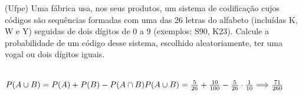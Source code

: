 \begin{ex}
(Ufpe) Uma fábrica usa, nos seus produtos, um sistema de codificação cujos códigos são sequências formadas com uma das 26 letras do alfabeto (incluídas K, W e Y) seguidas de dois dígitos de 0 a 9 (exemplos: S90, K23). Calcule a probabilidade de um código desse sistema, escolhido aleatoriamente, ter uma vogal ou dois dígitos iguais.
  \begin{sol}
   \phantom{A} \\
   $P(A\cup B)=P(A)+P(B)-P(A\cap B) \\
   P(A\cup B)= \frac{5}{26}+\frac{10}{100}-\frac{5}{26}\cdot\frac{1}{10} \Longrightarrow \frac{71}{260}$
  \end{sol}
\end{ex}